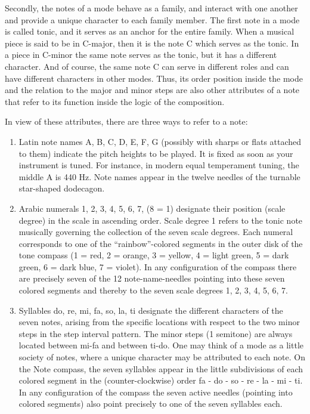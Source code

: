 Secondly, the notes of a mode behave as a family, and interact with one another and provide a unique character to each family member. The first note in a mode is called tonic, and it serves as an anchor for the entire family. When a musical piece is said to be in C-major, then it is the note C which serves as the tonic. In a piece in C-minor the same note serves as the tonic, but it has a different character. And of course, the same note C can serve in different roles and can have different characters in other modes. Thus, its order position inside the mode and the relation to the major and minor steps are also other attributes of a note that refer to its function inside the logic of the composition.

In view of these attributes, there are three ways to refer to a note:

\begin{enumerate} 

\item Latin note names A, B, C, D, E, F, G (possibly with sharps or flats attached to them) indicate the pitch heights to be played. It is fixed as soon as your instrument is tuned. For instance, in modern equal temperament tuning, the middle A is 440 Hz. Note names appear in the twelve needles of the turnable star-shaped dodecagon.

\item Arabic numerals 1, 2, 3, 4, 5, 6, 7, (8 = 1) designate their position (scale degree) in the scale in ascending order. Scale degree 1 refers to the tonic note musically governing the collection of the seven scale degrees. Each numeral corresponds to one of the ``rainbow''-colored segments in the outer disk of the tone compass (1 = red, 2 = orange, 3 = yellow, 4 = light green, 5 = dark green, 6 = dark blue, 7 = violet). In any configuration of the compass there are precisely seven of the 12 note-name-needles pointing into these seven colored segments and thereby to the seven scale degrees 1, 2, 3, 4, 5, 6, 7.  

\item Syllables do, re, mi, fa, so, la, ti designate the different characters of the seven notes, arising from the specific locations with respect to the two minor steps in the step interval pattern. The minor steps (1 semitone) are always located between mi-fa and between ti-do. One may think of a mode as a little society of notes, where a unique character may be attributed to each note. On the Note compass, the seven syllables appear in the little subdivisions of each colored segment in the (counter-clockwise) order fa - do - so - re - la - mi - ti. In any configuration of the compass the seven active needles (pointing into colored segments) also point precisely to one of the seven syllables each. 

\end{enumerate}

